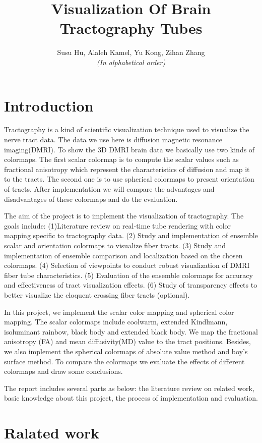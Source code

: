 \documentclass[hyperref, plainreport, noproblem]{cgvpub1}
\author{Susu Hu, Alaleh Kamel, Yu Kong, Zihan Zhang\\\small\textit{(In alphabetical order)}}
\title{Visualization Of Brain Tractography Tubes}
\begin{document}
\chapter{Introduction}

Tractography is a kind of scientific visualization technique used to visualize the nerve tract data. The data we use here is diffusion magnetic resonance imaging(DMRI). To show the 3D DMRI brain data we basically use two kinds of colormaps. The first scalar colormap is to compute the scalar values such as fractional anisotropy which represent the characteristics of diffusion and map it to the tracts. The second one is to use spherical colormaps to present orientation of tracts. After implementation we will compare the advantages and disadvantages of these colormaps and do the evaluation.

The aim of the project is to implement the visualization of tractography. The goals include: (1)Literature review on real-time tube rendering with color mapping specific to tractography data. (2) Study and implementation of ensemble scalar and orientation colormaps to visualize fiber tracts. (3) Study and implementation of ensemble comparison and localization based on the chosen colormaps. (4) Selection of viewpoints to conduct robust visualization of DMRI fiber tube characteristics. (5) Evaluation of the ensemble colormaps for accuracy and effectiveness of tract visualization effects. (6) Study of transparency effects to better visualize the eloquent crossing fiber tracts (optional).

In this project, we implement the scalar color mapping and spherical color mapping. The scalar colormaps include coolwarm, extended Kindlmann, isoluminant rainbow, black body and extended black body. We map the fractional anisotropy (FA) and mean diffusivity(MD) value to the tract positions. Besides, we also implement the spherical colormaps of absolute value method and boy’s surface method. To compare the colormaps we evaluate the effects of different colormaps and draw some conclusions.

The report includes several parts as below: the literature review on related work, basic knowledge about this project, the process of implementation and evaluation.


\chapter{Ralated work}
\end{document}
